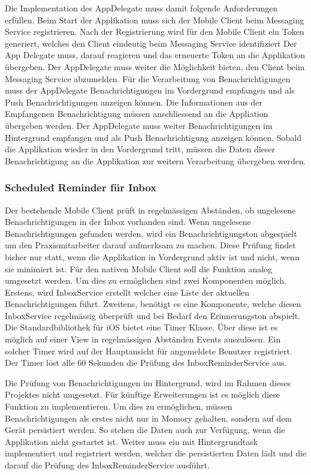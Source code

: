 Die Implementation des AppDelegate muss damit folgende Anforderungen erfüllen.
Beim Start der Applikation muss sich der Mobile Client beim Messaging Service registrieren.
Nach der Registrierung wird für den Mobile Client ein Token generiert, welches den Client eindeutig beim Messaging Service identifiziert
Der App Delegate muss, darauf reagieren und das erneuerte Token an die Applikation übergeben.
Der AppDelegate muss weiter die Möglichkeit bieten, den Client beim Messaging Service abzumelden.
Für die Verarbeitung von Benachrichtigungen muss der AppDelegate Benachrichtigungen im Vordergrund empfangen und als Push Benachrichtigungen anzeigen können.
Die Informationen aus der Empfangenen Benachrichtigung müssen anschliessend an die Appliation übergeben werden.
Der AppDelegate muss weiter Benachrichtigungen im Hintergrund empfangen und als Push Benachrichtigung anzeigen können.
Sobald die Applikation wieder in den Vordergrund tritt, müssen die Daten dieser Benachrichtigung an die Applikation zur weitern Verarbeitung übergeben werden.

\subsubsection{Scheduled Reminder für Inbox}

Der bestehende Mobile Client prüft in regelmässigen Abständen, ob ungelesene Benachrichtigungen in der Inbox vorhanden sind.
Wenn ungelesene Benachrichtigungen gefunden werden, wird ein Benachrichtigungston abgespielt um den Praxismitarbeiter darauf aufmerksam zu machen.
Diese Prüfung findet bisher nur statt, wenn die Applikation in Vordergrund aktiv ist und nicht, wenn sie minimiert ist.
Für den nativen Mobile Client soll die Funktion analog umgesetzt werden.
Um dies zu ermöglichen sind zwei Komponenten möglich.
Erstens, wird InboxService erstellt welcher eine Liste der aktuellen Benachrichtigungen führt.
Zweitens, benötigt es eine Komponente, welche diesen InboxService regelmässig überprüft und bei Bedarf den Erinnerungston abspielt.
Die Standardbibliothek für iOS bietet eine Timer Klasse.
Über diese ist es möglich auf einer View in regelmässigen Abständen Events auszulösen.\cite{ios_timer}
Ein solcher Timer wird auf der Hauptansicht für angemeldete Benutzer registriert.
Der Timer löst alle 60 Sekunden die Prüfung des InboxReminderService aus.

Die Prüfung von Benachrichtigungen im Hintergrund, wird im Rahmen dieses Projektes nicht umgesetzt.
Für künftige Erweiterungen ist es möglich diese Funktion zu implementieren.
Um dies zu ermöglichen, müssen Benachrichtigungen als erstes nicht nur in Momory gehalten, sondern auf dem Gerät persistiert werden.
So stehen die Daten auch zur Verfügung, wenn die Applikation nicht gestartet ist.
Weiter muss ein  mit Hintergrundtask\cite{ios_bgtaskscheduler} implementiert und registriert werden, welcher die persistierten Daten lädt und die darauf die Prüfung des InboxReminderService ausführt.

